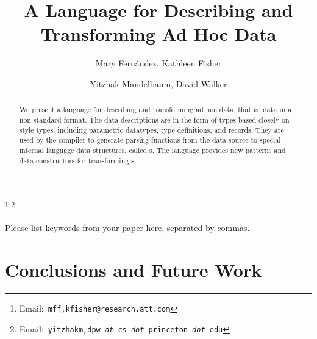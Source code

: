 \documentclass{entcs}
\begin{document}
\begin{frontmatter}
  \title{A Language for Describing and Transforming Ad Hoc Data} 
  \author{Mary Fern\'andez,
    Kathleen Fisher}
  \address{AT\&T\\ 
    Florham Park,NJ USA} 
  \author{Yitzhak Mandelbaum,
    David Walker}
  \address{Department of Computer Science\\ 
    Princeton University\\
    Princeton,NJ USA} 
  \thanks[attemail]{Email:\texttt{\normalshape
        mff,kfisher@research.att.com}}
  \thanks[premail]{Email:\texttt{\normalshape
        yitzhakm,dpw {\it at} cs {\it dot} princeton {\it dot} edu}}
\begin{abstract} 
  We present a language for describing and transforming ad hoc data,
  that is, data in a non-standard format. The data descriptions are in
  the form of types based closely on \ml{}-style types, including
  parametric datatypes, type definitions, and records. They are used
  by the compiler to generate parsing functions from the data source
  to special internal language data structures, called \pvalue{}s.
  The language provides new patterns and data constructors for 
  transforming \pvalue{}s.
\end{abstract}
\begin{keyword}
  Please list keywords from your paper here, separated by commas.
\end{keyword}
\end{frontmatter}











\section{Conclusions and Future Work}
\label{sec:conclusion}



\end{document}
